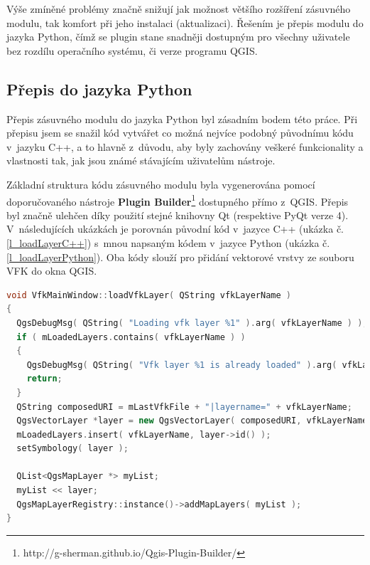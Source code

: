 \documentclass[a4paper,12pt,oneside]{book}
\begin{document}
Výše zmíněné problémy značně snižují jak možnost většího rozšíření zásuvného modulu, tak komfort při jeho instalaci (aktualizaci). Řešením je přepis modulu do jazyka Python, čímž se plugin stane snadněji dostupným pro všechny uživatele bez rozdílu operačního systému, či verze programu QGIS.

\subsection{Přepis do jazyka Python}
Přepis zásuvného modulu do jazyka Python byl zásadním bodem této práce. Při přepisu jsem se snažil kód vytvářet co možná nejvíce podobný původnímu kódu v~jazyku C++, a to hlavně z~důvodu, aby byly zachovány veškeré funkcionality a vlastnosti tak, jak jsou známé stávajícím uživatelům nástroje.

Základní struktura kódu zásuvného modulu byla vygenerována pomocí doporučovaného nástroje \textbf{Plugin Builder}\footnote{http://g-sherman.github.io/Qgis-Plugin-Builder/} dostupného přímo z~QGIS. Přepis byl značně ulehčen díky použití stejné knihovny Qt (respektive PyQt verze 4). V~následujících ukázkách je porovnán původní kód v~jazyce C++ (ukázka č. \ref{l_loadLayerC++}) s~mnou napsaným kódem v~jazyce Python (ukázka č. \ref{l_loadLayerPython}). Oba kódy slouží pro přidání vektorové vrstvy ze souboru VFK do okna QGIS.

\begin{lstlisting}[language=C++, 
		    caption=Kód pro načtení vektorové vrstvy v~C++, 
		    keywordstyle=\color{blue}\ttfamily,
		    stringstyle=\color{red}\ttfamily,
		    commentstyle=\color{green}\ttfamily, morekeywords={QgsDebugMsg,QString,QgsVectorLayer,QList,QgsMapLayerRegistry},
		    label=l_loadLayerC++]
 void VfkMainWindow::loadVfkLayer( QString vfkLayerName )
{
  QgsDebugMsg( QString( "Loading vfk layer %1" ).arg( vfkLayerName ) );
  if ( mLoadedLayers.contains( vfkLayerName ) )
  {
    QgsDebugMsg( QString( "Vfk layer %1 is already loaded" ).arg( vfkLayerName ) );
    return;
  }
  QString composedURI = mLastVfkFile + "|layername=" + vfkLayerName;
  QgsVectorLayer *layer = new QgsVectorLayer( composedURI, vfkLayerName, "ogr" );
  mLoadedLayers.insert( vfkLayerName, layer->id() );
  setSymbology( layer );

  QList<QgsMapLayer *> myList;
  myList << layer;
  QgsMapLayerRegistry::instance()->addMapLayers( myList );
}
\end{lstlisting}
\end{document}
